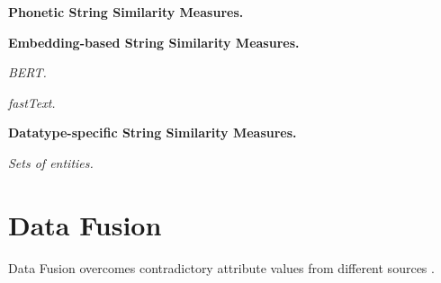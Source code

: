 \textbf{Phonetic String Similarity Measures.}

\textbf{Embedding-based String Similarity Measures.}

\textit{BERT.}

\textit{fastText.}

\textbf{Datatype-specific String Similarity Measures.}

\textit{Sets of entities.}

\section{Data Fusion}

Data Fusion overcomes contradictory attribute values from different sources \cite{Bleiholder2009DataF}.